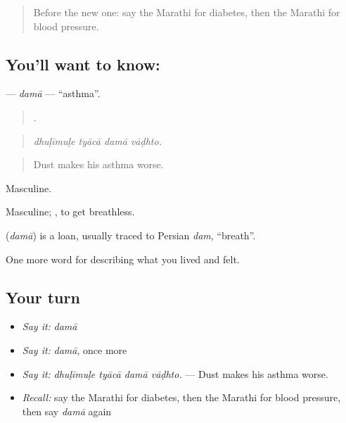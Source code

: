 \label{lesson:MR-C485-dama}



\begin{quote}
Before the new one: say the Marathi for diabetes, then the Marathi for blood pressure.
\end{quote}

\subsection*{You'll want to know: }
\textbf{} — \emph{damā} — \textquotedblleft{}asthma\textquotedblright{}.

\begin{quote}
   .
\end{quote}

\begin{quote}
\emph{dhuḷīmuḷe tyācā damā vāḍhto.}
\end{quote}

\begin{quote}
Dust makes his asthma worse.
\end{quote}

Masculine.

Masculine;  , to get breathless.

\begin{cousinweb}
\textbf{} (\emph{damā}) is a loan, usually traced to Persian \emph{dam}, \textquotedblleft{}breath\textquotedblright{}.
\end{cousinweb}

\begin{grammarlens}[title={What you've built}]
One more word for describing what you lived and felt.
\end{grammarlens}

\subsection*{Your turn}
\begin{itemize}
\raggedright
  \item \emph{Say it:} \emph{damā}
  \item \emph{Say it:} \emph{damā}, once more
  \item \emph{Say it:} \emph{dhuḷīmuḷe tyācā damā vāḍhto.} — Dust makes his asthma worse.
  \item \emph{Recall:} say the Marathi for diabetes, then the Marathi for blood pressure, then say \emph{damā} again
\end{itemize}

